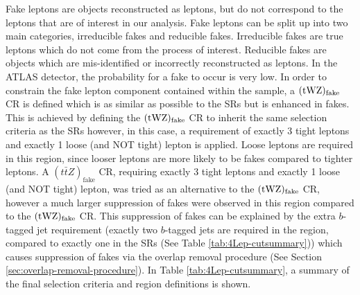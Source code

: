 Fake leptons are objects reconstructed as leptons, but do not correspond to the leptons that are of interest in our analysis. Fake leptons can be split up into two main categories, irreducible fakes and reducible fakes. Irreducible fakes are true leptons which do not come from the process of interest. Reducible fakes are objects which are mis-identified or incorrectly reconstructed as leptons. In the ATLAS detector, the probability for a fake to occur is very low. In order to constrain the fake lepton component contained within the \ttZ sample, a $(\tWZ)_{\text{fake}}$ CR is defined which is as similar as possible to the \tWZ SRs but is enhanced in fakes. This is achieved by defining the $(\tWZ)_{\text{fake}}$ CR to inherit the same selection criteria as the \tWZ SRs however, in this case, a requirement of exactly 3 tight leptons and exactly 1 loose (and NOT tight) lepton is applied. Loose leptons are required in this region, since looser leptons are more likely to be fakes compared to tighter leptons. A $(t\bar{t}Z)_{\text{fake}}$ CR, requiring exactly 3 tight leptons and exactly 1 loose (and NOT tight) lepton, was tried as an alternative to the $(\tWZ)_{\text{fake}}$ CR, however a much larger suppression of fakes were observed in this region compared to the $(\tWZ)_{\text{fake}}$ CR. This suppression of fakes can be explained by the extra $b$-tagged jet requirement (exactly two $b$-tagged jets are required in the \ttZ region, compared to exactly one in the \tWZ SRs (See Table \ref{tab:4Lep-cutsummary})) which causes suppression of fakes via the overlap removal procedure (See Section \ref{sec:overlap-removal-procedure}). In Table \ref{tab:4Lep-cutsummary}, a summary of the final selection criteria and region definitions is shown.
